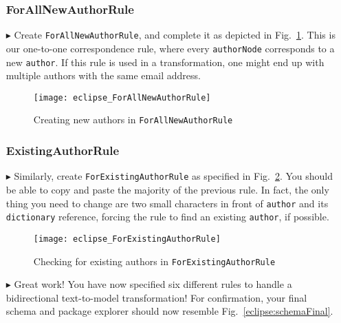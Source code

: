 \begin{itemize}
\subsubsection{ForAllNewAuthorRule} %

\item[$\blacktriangleright$] Create \texttt{ForAllNewAuthorRule}, and complete it as depicted in Fig.~\ref{eclipse:ForAllNewAuthorRule}. This is our one-to-one
correspondence rule, where every \texttt{authorNode} corresponds to a new \texttt{author}. If this rule is used in a transformation, one might end up with
multiple authors with the same email address.

\begin{figure}[htbp]
\begin{center}
  \texttt{[image: eclipse\_ForAllNewAuthorRule]}
  \caption{Creating new authors in \texttt{ForAllNewAuthorRule}}
  \label{eclipse:ForAllNewAuthorRule}
\end{center}
\end{figure}

\subsubsection{ExistingAuthorRule} %

\item[$\blacktriangleright$] Similarly, create \texttt{ForExistingAuthorRule} as specified in Fig.~\ref{eclipse:ForExistingAuthorRule}. You should be able to
copy and paste the majority of the previous rule. In fact, the only thing you need to change are two small characters in front of \texttt{author} and its
\texttt{dictionary} reference, forcing the rule to find an existing \texttt{author}, if possible.

\begin{figure}[htbp]
\begin{center}
  \texttt{[image: eclipse\_ForExistingAuthorRule]}
  \caption{Checking for existing authors in \texttt{ForExistingAuthorRule}}
  \label{eclipse:ForExistingAuthorRule}
\end{center}
\end{figure}

\newpage

\item[$\blacktriangleright$] Great work! You have now specified six different rules to handle a bidirectional text-to-model transformation! For confirmation,
your final schema and package explorer should now resemble Fig.~\ref{eclipse:schemaFinal}.


\end{itemize}
